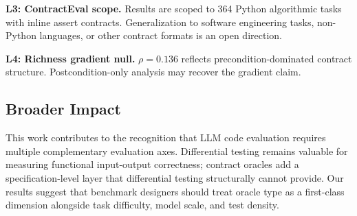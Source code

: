 \textbf{L3: ContractEval scope.} Results are scoped to 364 Python algorithmic tasks with inline assert contracts. Generalization to software engineering tasks, non-Python languages, or other contract formats is an open direction.

\textbf{L4: Richness gradient null.} $\rho = 0.136$ reflects precondition-dominated contract structure. Postcondition-only analysis may recover the gradient claim.

\subsection{Broader Impact}

This work contributes to the recognition that LLM code evaluation requires multiple complementary evaluation axes. Differential testing remains valuable for measuring functional input-output correctness; contract oracles add a specification-level layer that differential testing structurally cannot provide. Our results suggest that benchmark designers should treat oracle type as a first-class dimension alongside task difficulty, model scale, and test density.

